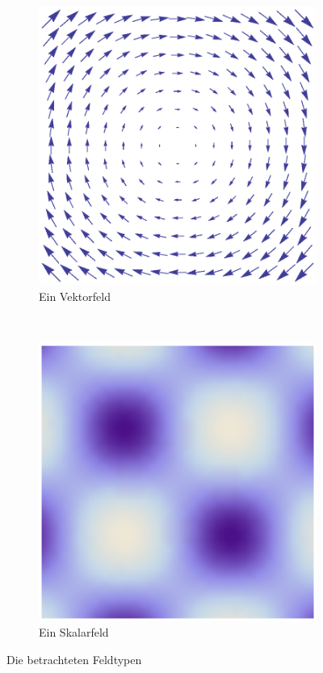 \begin{figure}
	\begin{subfigure}[b]{0.5\textwidth}
		\centering
		\includegraphics[width=\textwidth]{images/vectorfield}
		\caption{Ein Vektorfeld}
		\label{mathematics_vectorfield}
	\end{subfigure}
	~
	\begin{subfigure}[b]{0.5\textwidth}
		\centering
		\includegraphics[width=\textwidth]{images/scalarfield}
		\caption{Ein Skalarfeld}
		\label{mathematics_scalarfield}
	\end{subfigure}
	\caption{Die betrachteten Feldtypen}
\end{figure}

